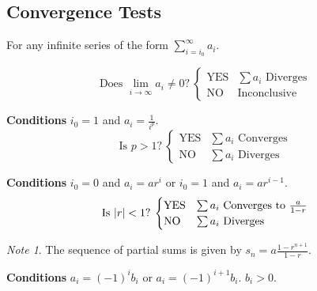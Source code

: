 \documentclass{article}
\theoremstyle{plain}
\numberwithin{theorem}{subsection}
\theoremstyle{definition}
\numberwithin{definition}{subsection}
\theoremstyle{remark}
\newtheorem{note}{Note}[section]
\numberwithin{note}{subsection}
\begin{document}
\subsection{Convergence Tests}
For any infinite series of the form $\displaystyle\sum_{i=i_0}^\infty a_i$.
\begin{multicols}{2}
	\begin{mdframed}[style=exampledefaultcols,frametitle={Divergence Test}]
		\begin{equation*}
			\text{Does $\lim_{i\to\infty}a_i\neq0$?}\:
			\begin{cases}
				\text{YES} & \text{$\sum a_i$ Diverges} \\
				\text{NO} & \text{Inconclusive}
			\end{cases}
		\end{equation*}
	\end{mdframed}
	\begin{mdframed}[style=exampledefaultcols,frametitle={$p$-Series}]
		\textbf{Conditions} $i_0=1$ and $a_i = \frac{1}{i^p}$.
		\begin{equation*}
			\text{Is $p>1$?}\:
			\begin{cases}
				\text{YES} & \text{$\sum a_i$ Converges} \\
				\text{NO} & \text{$\sum a_i$ Diverges}
			\end{cases}
		\end{equation*}
	\end{mdframed}
	\begin{mdframed}[style=exampledefaultcols,frametitle={Geometric Series}]
		\textbf{Conditions} $i_0=0$ and $a_i = a r^i$ or $i_0=1$ and $a_i = a r^{i-1}$.
		\begin{equation*}
			\text{Is $\abs{r}<1$?}\:
			\begin{cases}
				\text{YES} & \text{$\sum a_i$ Converges to $\frac{a}{1-r}$} \\
				\text{NO} & \text{$\sum a_i$ Diverges}
			\end{cases}
		\end{equation*}
	\end{mdframed}
	\begin{note}
		The sequence of partial sums is given by $\displaystyle s_n=a\frac{1-r^{n+1}}{1-r}$.
	\end{note}
	\begin{mdframed}[style=exampledefaultcols,frametitle={Alternating Series}]
		\textbf{Conditions} $a_i = \left( -1 \right)^i b_i$ or $a_i = \left( -1 \right)^{i+1} b_i$. $b_i>0$.
		\begin{equation*}

\end{equation*}
\end{mdframed}
\end{multicols}
\end{document}
